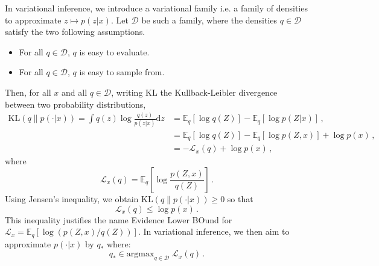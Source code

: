 \documentclass[english,graybox,envcountchap,envcountsame,sectrefs,shortlabels]{svmono}
\theoremstyle{style}
\begin{document}
\medskip

In variational inference, we introduce a variational family i.e. a family of densities to  approximate $z\mapsto p(z|x)$. Let $\mathcal{D}$ be such a family, where the densities $q \in\mathcal{D}$ satisfy the two following assumptions.
\begin{itemize}
\item For all $q\in \mathcal{D}$, $q$ is easy to evaluate.
\item For all $q\in \mathcal{D}$, $q$ is easy to sample from.
\end{itemize}

\medskip

Then, for all $x$ and all $q\in \mathcal{D}$, writing $\mathrm{KL}$ the Kullback-Leibler divergence between two probability distributions,
\begin{align*}
\mathrm{KL}\left(q\|p(\cdot|x)\right) = \int q(z) \log \frac{q(z)}{p(z|x)} \mathrm{d}z&= \mathbb{E}_{q}[\log q(Z)] - \mathbb{E}_{q}[\log p(Z|x)]\,,\\
 &= \mathbb{E}_{q}[\log q(Z)] - \mathbb{E}_{q}[\log p(Z,x)]+\log p(x)\,,\\
&= -\mathcal{L}_x(q)+\log p(x)\,,
\end{align*}
where
$$
\mathcal{L}_x(q) = \mathbb{E}_{q}\left[\log \frac{p(Z,x)}{q(Z)}\right]\,.
$$
Using Jensen's inequality, we obtain $\mathrm{KL}\left(q\|p(\cdot|x)\right) \geq 0$ so that
$$
\mathcal{L}_x(q)\leq \log p(x)\,.
$$
This inequality justifies the name Evidence Lower BOund for $\mathcal{L}_x = \mathbb{E}_{q}[\log (p(Z,x)/q(Z))]$. In variational inference, we then aim to approximate  $p(\cdot|x)$ by $q_{*}$ where:
$$
q_* \in \mathrm{argmax}_{q\in \mathcal{D}}\;\mathcal{L}_x(q)\,.
$$
\end{document}
